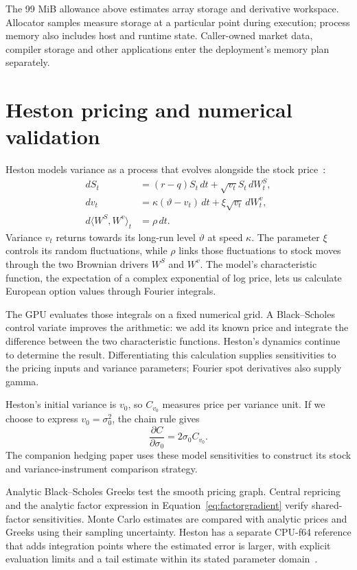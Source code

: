 \documentclass[8pt]{strategynet-journal}
\begin{document}
\begin{SNcolumns}
The 99 MiB allowance above estimates array storage and derivative workspace.
Allocator samples measure storage at a particular point during execution;
process memory also includes host and runtime state. Caller-owned market data, compiler storage and other
applications enter the deployment's memory plan separately.

\section{Heston pricing and numerical validation}
Heston models variance as a process that evolves alongside the stock price~\cite{heston}:
\begin{align*}
 dS_t&=(r-q)S_t\,dt+\sqrt{v_t}S_t\,dW_t^S,\\
 dv_t&=\kappa(\vartheta-v_t)\,dt+\xi\sqrt{v_t}\,dW_t^v,\\
 d\langle W^S,W^v\rangle_t&=\rho\,dt.
\end{align*}
Variance $v_t$ returns towards its long-run level $\vartheta$ at speed
$\kappa$. The parameter $\xi$ controls its random fluctuations, while $\rho$
links those fluctuations to stock moves through the two Brownian drivers
$W^S$ and $W^v$. The model's characteristic function,
the expectation of a complex exponential of log price, lets us calculate
European option values through Fourier integrals.

The GPU evaluates those integrals on a fixed numerical grid. A
Black--Scholes control variate improves the arithmetic: we add its known
price and integrate the difference between the two characteristic functions.
Heston's dynamics continue to determine the result. Differentiating this
calculation supplies sensitivities to the pricing inputs and variance
parameters; Fourier spot derivatives also supply gamma.

Heston's initial variance is
$v_0$, so $C_{v_0}$ measures price per variance unit. If we choose to express
$v_0=\sigma_0^2$, the chain rule gives
\[
 \frac{\partial C}{\partial\sigma_0}=2\sigma_0 C_{v_0}.
\]
The companion
hedging paper uses these model sensitivities to construct its stock and
variance-instrument comparison strategy.

Analytic Black--Scholes Greeks test the smooth pricing graph. Central
repricing and the analytic factor expression in Equation~\eqref{eq:factorgradient}
verify shared-factor sensitivities. Monte Carlo estimates are compared with
analytic prices and Greeks using their sampling uncertainty. Heston has a
separate CPU-f64 reference that adds integration points where the estimated error is larger,
with explicit evaluation limits and a tail estimate within its stated parameter domain~\cite{quadpack}.


\end{SNcolumns}
\end{document}
